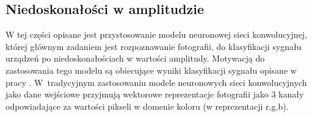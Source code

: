

        

\subsection{Niedoskonałości w amplitudzie}
W tej części opisane jest przystosowanie modelu neuronowej sieci konwolucyjnej, której głównym zadaniem jest rozpoznawanie fotografii, do klasyfikacji sygnału urządzeń po niedoskonałościach w wartości amplitudy. Motywacją do zastosowania tego modelu są obiecujące wyniki klasyfikacji sygnału opisane w pracy \cite{sankhe2019oracle}. W~tradycyjnym zastosowaniu modele neuronowych sieci konwolucyjnych jako dane wejściowe przyjmują wektorowe reprezentacje fotografii jako 3 kanały odpowiadające za wartości pikseli w domenie koloru (w reprezentacji r,g,b). 
